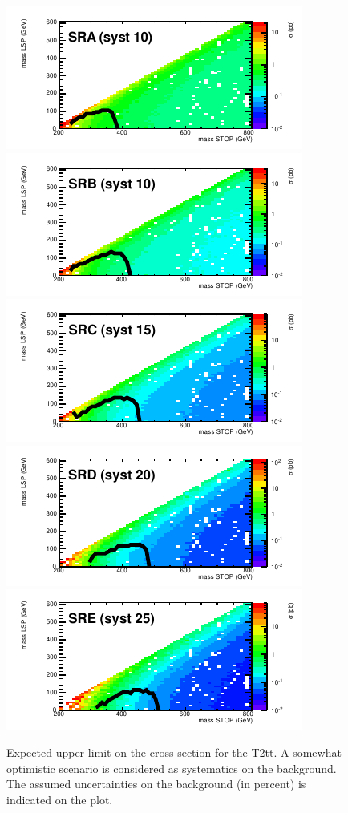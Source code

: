 \begin{figure}[hbt]
  \begin{center}
        \includegraphics[width=0.5\linewidth]{plots/stopPlot/masses_SRA_xsecO.pdf}%
        \includegraphics[width=0.5\linewidth]{plots/stopPlot/masses_SRB_xsecO.pdf}
        \includegraphics[width=0.5\linewidth]{plots/stopPlot/masses_SRC_xsecO.pdf}%
        \includegraphics[width=0.5\linewidth]{plots/stopPlot/masses_SRD_xsecO.pdf}
        \includegraphics[width=0.5\linewidth]{plots/stopPlot/masses_SRE_xsecO.pdf}%
    \caption{Expected upper limit on the cross section for the
      T2tt. A somewhat optimistic scenario is considered as systematics on the
      background.
The assumed uncertainties on the background (in percent) is indicated on the plot.}
\label{fig:limO}
      \end{center}
\end{figure}

